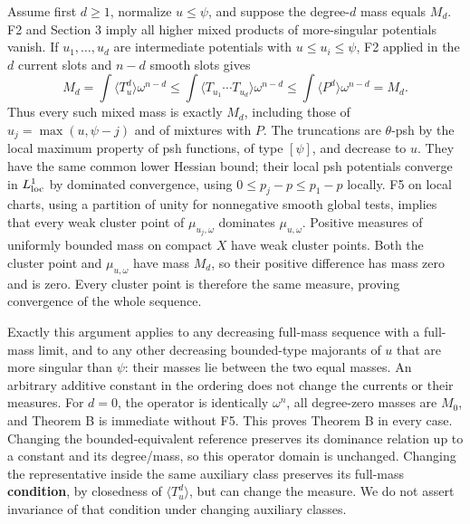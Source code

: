 \documentclass[
  10pt,
]{article}
\begin{document}
Assume first \(d\geq1\), normalize \(u\leq\psi\), and suppose the
degree-\(d\) mass equals \(M_d\). F2 and Section 3 imply all higher
mixed products of more-singular potentials vanish. If \(u_1,\ldots,u_d\)
are intermediate potentials with \(u\leq u_i\leq\psi\), F2 applied in
the \(d\) current slots and \(n-d\) smooth slots gives \[
M_d=\int\langle T_u^d\rangle\omega^{n-d}
\leq\int\langle T_{u_1}\cdots T_{u_d}\rangle\omega^{n-d}
\leq\int\langle P^d\rangle\omega^{n-d}=M_d.
\] Thus every such mixed mass is exactly \(M_d\), including those of
\(u_j=\max(u,\psi-j)\) and of mixtures with \(P\). The truncations are
\(\theta\)-psh by the local maximum property of psh functions, of type
\([\psi]\), and decrease to \(u\). They have the same common lower
Hessian bound; their local psh potentials converge in \(L^1_{\rm loc}\)
by dominated convergence, using \(0\leq p_j-p\leq p_1-p\) locally. F5 on
local charts, using a partition of unity for nonnegative smooth global
tests, implies that every weak cluster point of \(\mu_{u_j,\omega}\)
dominates \(\mu_{u,\omega}\). Positive measures of uniformly bounded
mass on compact \(X\) have weak cluster points. Both the cluster point
and \(\mu_{u,\omega}\) have mass \(M_d\), so their positive difference
has mass zero and is zero. Every cluster point is therefore the same
measure, proving convergence of the whole sequence.

Exactly this argument applies to any decreasing full-mass sequence with
a full-mass limit, and to any other decreasing bounded-type majorants of
\(u\) that are more singular than \(\psi\): their masses lie between the
two equal masses. An arbitrary additive constant in the ordering does
not change the currents or their measures. For \(d=0\), the operator is
identically \(\omega^n\), all degree-zero masses are \(M_0\), and
Theorem B is immediate without F5. This proves Theorem B in every case.
Changing the bounded-equivalent reference preserves its dominance
relation up to a constant and its degree/mass, so this operator domain
is unchanged. Changing the representative inside the same auxiliary
class preserves its full-mass \textbf{condition}, by closedness of
\(\langle T_u^d\rangle\), but can change the measure. We do not assert
invariance of that condition under changing auxiliary classes.
\end{document}
